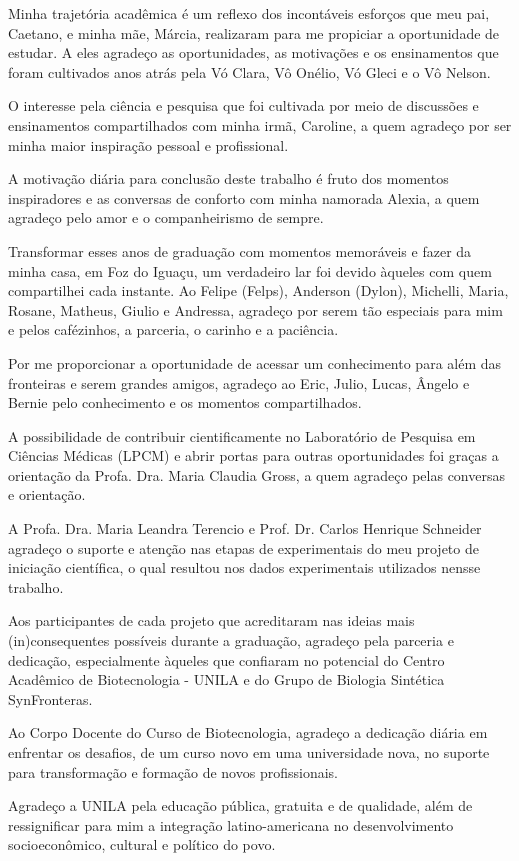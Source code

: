 
\begin{justify}

\hspace{12 mm}Minha trajetória acadêmica é um reflexo dos incontáveis esforços que meu pai, Caetano, e minha mãe, Márcia, realizaram para me propiciar a oportunidade de estudar. A eles agradeço as oportunidades, as motivações e os ensinamentos que foram cultivados anos atrás pela Vó Clara, Vô Onélio, Vó Gleci e o Vô Nelson. 

O interesse pela ciência e pesquisa  que foi cultivada por meio de discussões e ensinamentos compartilhados com minha irmã, Caroline, a quem agradeço por ser minha maior inspiração pessoal e profissional.

A motivação diária para conclusão deste trabalho é fruto dos momentos inspiradores e as conversas de conforto com minha namorada Alexia, a quem agradeço pelo amor e o companheirismo de sempre. 

Transformar esses anos de graduação com momentos memoráveis e fazer da minha casa, em Foz do Iguaçu, um verdadeiro lar foi devido àqueles com quem compartilhei cada instante. Ao Felipe (Felps), Anderson (Dylon), Michelli, Maria, Rosane, Matheus, Giulio e Andressa, agradeço por serem tão especiais para mim e pelos cafézinhos, a parceria, o carinho e a paciência.

Por me proporcionar a oportunidade de acessar um conhecimento para além das fronteiras e serem grandes amigos, agradeço ao Eric, Julio, Lucas, Ângelo e Bernie pelo conhecimento e os momentos compartilhados. 

A possibilidade de contribuir cientificamente no Laboratório de Pesquisa em Ciências Médicas (LPCM) e abrir portas para outras oportunidades foi graças a orientação da Profa. Dra. Maria Claudia Gross, a quem agradeço pelas conversas e orientação.

A Profa. Dra. Maria Leandra Terencio e Prof. Dr. Carlos Henrique Schneider agradeço o suporte e atenção nas etapas de experimentais do meu projeto de iniciação científica, o qual resultou nos dados experimentais utilizados nensse trabalho. 

Aos participantes de cada projeto que acreditaram nas ideias mais (in)consequentes possíveis durante a graduação, agradeço pela parceria e dedicação, especialmente àqueles que confiaram no potencial do Centro Acadêmico de Biotecnologia - UNILA e do Grupo de Biologia Sintética SynFronteras.

Ao Corpo Docente do Curso de Biotecnologia, agradeço a dedicação diária em enfrentar os desafios, de um curso novo em uma universidade nova, no suporte para transformação e formação de novos profissionais. 

Agradeço a UNILA pela educação pública, gratuita e de qualidade, além de ressignificar para mim a integração latino-americana no desenvolvimento socioeconômico, cultural e político do povo.


\end{justify}

